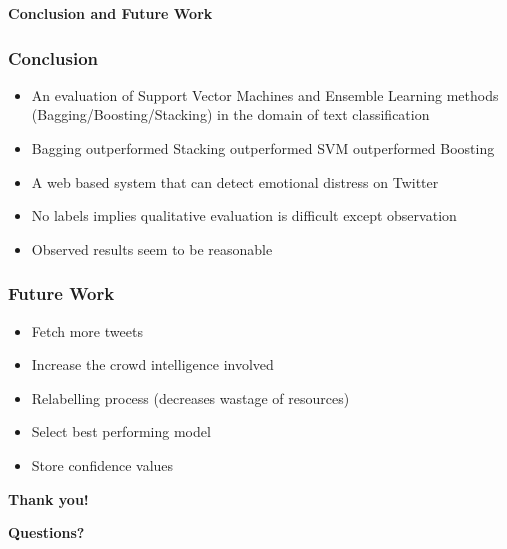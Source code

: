 \documentclass[9pt]{beamer}
\begin{document}
    \begin{frame}
        \begin{center}
            \textbf{Conclusion and Future Work}
        \end{center}
    \end{frame}
    
    \begin{frame}
        \frametitle{Conclusion}
        \begin{itemize}
            \item{An evaluation of Support Vector Machines and Ensemble Learning methods (Bagging/Boosting/Stacking) in the domain of text classification}
            \item{Bagging outperformed Stacking outperformed SVM outperformed Boosting}
            \item{A web based system that can detect emotional distress on Twitter}
            \item{No labels implies qualitative evaluation is difficult except observation}
            \item{Observed results seem to be reasonable}
        \end{itemize}
    \end{frame}
    
    \begin{frame}
        \frametitle{Future Work}
        \begin{itemize}
            \item{Fetch more tweets}
            \item{Increase the crowd intelligence involved}
            \item{Relabelling process (decreases wastage of resources)}
            \item{Select best performing model}
            \item{Store confidence values}
        \end{itemize}
    \end{frame}
    
    \begin{frame}
        \begin{center}
            \textbf{Thank you!}
        \end{center}
        \begin{center}
            \textbf{Questions?}
        \end{center}
    \end{frame}
\end{document}
